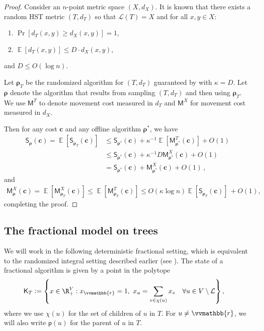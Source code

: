 \documentclass{toc}
\newcommand{\calL}{\mathcal L}
\newcommand{\mcost}{\mathsf{M}}
\newcommand{\vvr}{\vvmathbb{r}}
\newcommand{\scost}{\mathsf{S}}
\newcommand{\seteq}{\mathrel{\mathop:}=}
\newcommand{\sfp}{\mathsf{p}}
\newcommand{\sfK}{\mathsf K}
\DeclareMathOperator*{\Exp}{\mathbb{E}}
\begin{document}
\begin{proof}
	Consider an $n$-point metric space $(X,d_X)$.  It is known \cite{FRT04} that there
	exists a random HST metric $(T,d_T)$ so that $\calL(T)=X$ and for all $x,y \in X$:
	\begin{enumerate}
		\item $\Pr[d_T(x,y) \geq d_X(x,y)]=1$,
		\item $\Exp[d_T(x,y)] \leq D\cdot d_X(x,y)$,
	\end{enumerate}
	and $D \leq O(\log n)$.
	
	Let $\bm\rho_T$ be the randomized algorithm for $(T,d_T)$ guaranteed by  with $\kappa=D$.
	Let $\bm\rho$ denote the algorithm that results from sampling $(T,d_T)$ and then using $\bm\rho_T$.
	We use $\mcost^T$ to denote movement cost measured in $d_T$ and $\mcost^X$ for movement cost measured in $d_X$.
	
	Then for any cost $\bm{c}$ and any offline algorithm $\bm\rho^*$, we have
	\begin{align*}
	\scost_{\bm\rho}(\bm{c})  = \Exp[\scost_{\bm\rho_T}(\bm{c})] &\leq \scost_{\bm\rho^*}(\bm{c}) + \kappa^{-1} \Exp[\mcost^T_{\bm\rho^*}(\bm{c})] + O(1)\\
	&\leq \scost_{\bm\rho^*}(\bm{c}) + \kappa^{-1} D \mcost^X_{\bm\rho^*}(\bm{c}) + O(1) \\
	&= \scost_{\bm\rho^*}(\bm{c}) + \mcost^X_{\bm\rho^*}(\bm{c}) + O(1)\,,
	\end{align*}
	and
	\begin{align*}
	\mcost_{\bm{\rho}}^X(\bm{c}) = \Exp[\mcost^X_{\bm\rho_T}(\bm{c})] \leq \Exp[\mcost^T_{\bm\rho_T}(\bm{c})] \leq O(\kappa \log n) \Exp[\scost_{\bm\rho_T}(\bm{c})]\,+ O(1),
	\end{align*}
	completing the proof.
\end{proof}

\subsection{The fractional model on trees}

We will work in the following deterministic fractional setting, which is equivalent to the randomized integral setting described earlier (see \cite[\S 2]{BCLL19}). The state of a fractional algorithm is given by a point in the polytope
\begin{align}\label{eq:mtsK}
\sfK_T &\seteq \left\{ x \in \R_+^{V} : x_{\vvr} = 1,\ x_u = \sum_{v \in \chi(u)} x_v \quad \forall u \in V \setminus \calL\right\},
\end{align}
where we use $\chi(u)$ for the set of children of $u$ in $T$. For $u \ne\vvr$, we will also write $\sfp(u)$ for the parent of $u$ in $T$.
\end{document}

